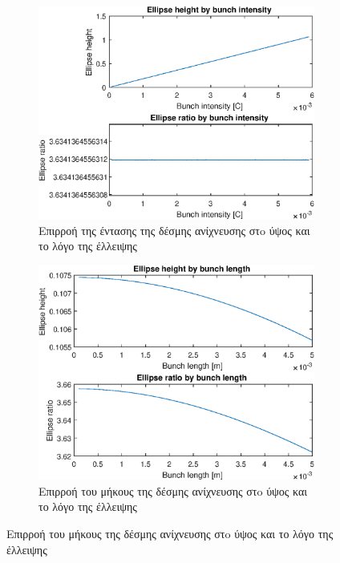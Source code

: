 \begin{figure}[tph]	
	\begin{subfigure}{0.47\textwidth}
		\includegraphics[width=\linewidth]{figures/MATLAB-variable-analysis/EBS-variables-intensity}
		\centering
		\caption{Επιρροή της έντασης της δέσμης ανίχνευσης στo ύψος και το λόγο της έλλειψης}
		\label{fig:EBS-variables-intensity}
	\end{subfigure}
	\hfill
	\begin{subfigure}{0.47\textwidth}
		\includegraphics[width=\linewidth]{figures/MATLAB-variable-analysis/EBS-variables-length}
		\centering
		\caption{Επιρροή του μήκους της δέσμης ανίχνευσης στo ύψος και το λόγο της έλλειψης}

\end{subfigure}
\end{figure}
